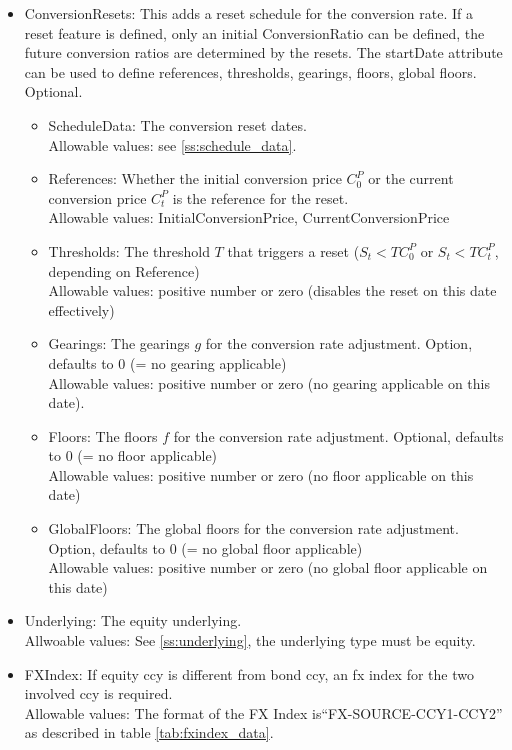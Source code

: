 \begin{itemize}
\item ConversionResets: This adds a reset schedule for the conversion rate. If a reset feature is defined, only an
  initial ConversionRatio can be defined, the future conversion ratios are determined by the resets. The startDate
  attribute can be used to define references, thresholds, gearings, floors, global floors. Optional.
  \begin{itemize}
  \item ScheduleData: The conversion reset dates. \\
      Allowable values: see \ref{ss:schedule_data}.
  \item References: Whether the initial conversion price $C^P_0$ or the current conversion price $C^P_t$ is the reference for the reset.\\
    Allowable values: InitialConversionPrice, CurrentConversionPrice
  \item Thresholds: The threshold $T$ that triggers a reset ($S_t < TC^P_0$ or $S_t < TC^P_t$, depending on Reference)\\
    Allowable values: positive number or zero (disables the reset on this date effectively)
  \item Gearings: The gearings $g$ for the conversion rate adjustment. Option, defaults to $0$ (= no gearing applicable)\\
    Allowable values: positive number or zero (no gearing applicable on this date).
  \item Floors: The floors $f$ for the conversion rate adjustment. Optional, defaults to $0$ (= no floor applicable)\\
    Allowable values: positive number or zero (no floor applicable on this date)
  \item GlobalFloors: The global floors for the conversion rate adjustment. Option, defaults to $0$ (= no global floor applicable)\\
    Allowable values: positive number or zero (no global floor applicable on this date)
  \end{itemize}

\item Underlying: The equity underlying. \\
  Allwoable values: See \ref{ss:underlying}, the underlying type must be equity.

\item FXIndex: If equity ccy is different from bond ccy, an fx index for the two involved ccy is required. \\
  Allowable values:  The format of the FX Index is``FX-SOURCE-CCY1-CCY2'' as described in table \ref{tab:fxindex_data}.


\end{itemize}
